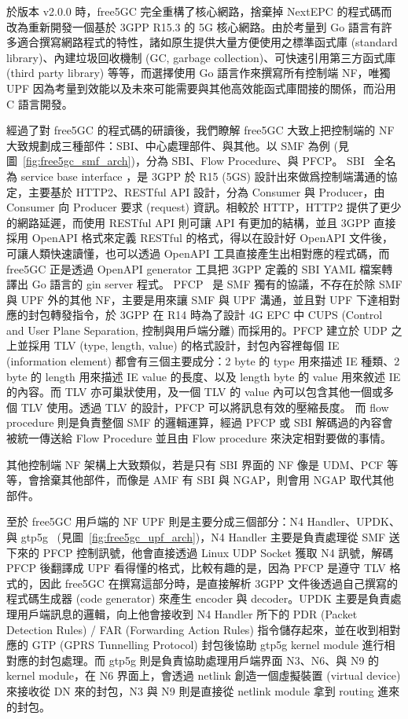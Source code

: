 於版本 v2.0.0 時，free5GC 完全重構了核心網路，捨棄掉 NextEPC 的程式碼而改為重新開發一個基於 3GPP R15.3 的 5G 核心網路。由於考量到 Go 語言有許多適合撰寫網路程式的特性，諸如原生提供大量方便使用之標準函式庫 (standard library)、內建垃圾回收機制 (GC, garbage collection)、可快速引用第三方函式庫 (third party library) 等等，而選擇使用 Go 語言作來撰寫所有控制端 NF，唯獨 UPF 因為考量到效能以及未來可能需要與其他高效能函式庫間接的關係，而沿用 C 語言開發。

經過了對 free5GC 的程式碼的研讀後，我們瞭解 free5GC 大致上把控制端的 NF 大致規劃成三種部件：SBI、中心處理部件、與其他。以 SMF 為例 (見圖~\ref{fig:free5gc_smf_arch})，分為 SBI、Flow Procedure、與 PFCP。
SBI~\cite{3gpp.29.500} 全名為 service base interface
，是 3GPP 於 R15 (5GS) 設計出來做爲控制端溝通的協定，主要基於 HTTP2、RESTful API 設計，分為 Consumer 與 Producer，由 Consumer 向 Producer 要求 (request) 資訊。相較於 HTTP，HTTP2 提供了更少的網路延遲，而使用 RESTful API 則可讓 API 有更加的結構，並且 3GPP 直接採用 OpenAPI 格式來定義 RESTful 的格式，得以在設計好 OpenAPI 文件後，可讓人類快速讀懂，也可以透過 OpenAPI 工具直接產生出相對應的程式碼，而 free5GC 正是透過 OpenAPI generator 工具把 3GPP 定義的 SBI YAML 檔案轉譯出 Go 語言的 gin server 程式。
PFCP~\cite{3gpp.29.244} 是 SMF 獨有的協議，不存在於除 SMF 與 UPF 外的其他 NF，主要是用來讓 SMF 與 UPF 溝通，並且對 UPF 下達相對應的封包轉發指令，於 3GPP 在 R14 時為了設計 4G EPC 中 CUPS (Control and User Plane Separation, 控制與用戶端分離) 而採用的。PFCP 建立於 UDP 之上並採用 TLV (type, length, value) 的格式設計，封包內容裡每個 IE (information element) 都會有三個主要成分：2 byte 的 type 用來描述 IE 種類、2 byte 的 length 用來描述 IE value 的長度、以及 length byte 的 value 用來敘述 IE 的內容。而 TLV 亦可巢狀使用，及一個 TLV 的 value 內可以包含其他一個或多個 TLV 使用。透過 TLV 的設計，PFCP 可以將訊息有效的壓縮長度。
而 flow procedure 則是負責整個 SMF 的邏輯運算，經過 PFCP 或 SBI 解碼過的內容會被統一傳送給 Flow Procedure 並且由 Flow procedure 來決定相對要做的事情。

其他控制端 NF 架構上大致類似，若是只有 SBI 界面的 NF 像是 UDM、PCF 等等，會捨棄其他部件，而像是 AMF 有 SBI 與 NGAP，則會用 NGAP 取代其他部件。

至於 free5GC 用戶端的 NF UPF 則是主要分成三個部分：N4 Handler、UPDK、與 gtp5g~\cite{gtp5g} (見圖~\ref{fig:free5gc_upf_arch})，N4 Handler 主要是負責處理從 SMF 送下來的 PFCP 控制訊號，他會直接透過 Linux UDP Socket 獲取 N4 訊號，解碼 PFCP 後翻譯成 UPF 看得懂的格式，比較有趣的是，因為 PFCP 是遵守 TLV 格式的，因此 free5GC 在撰寫這部分時，是直接解析 3GPP 文件後透過自己撰寫的程式碼生成器 (code generator) 來產生 encoder 與 decoder。UPDK 主要是負責處理用戶端訊息的邏輯，向上他會接收到 N4 Handler 所下的 PDR (Packet Detection Rules) / FAR (Forwarding Action Rules) 指令儲存起來，並在收到相對應的 GTP (GPRS Tunnelling Protocol) 封包後協助 gtp5g kernel module 進行相對應的封包處理。而 gtp5g 則是負責協助處理用戶端界面 N3、N6、與 N9 的 kernel module，在 N6 界面上，會透過 netlink 創造一個虛擬裝置 (virtual device) 來接收從 DN 來的封包，N3 與 N9 則是直接從 netlink module 拿到 routing 進來的封包。

